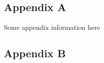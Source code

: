\documentclass[11pt,preprint, authoryear]{elsarticle}
\numberwithin{equation}{section}
\numberwithin{figure}{section}
\numberwithin{table}{section}
\begin{document}
\hypertarget{appendix-a}{%
\subsection*{Appendix A}\label{appendix-a}}

Some appendix information here

\hypertarget{appendix-b}{%
\subsection*{Appendix B}\label{appendix-b}}


\end{document}
